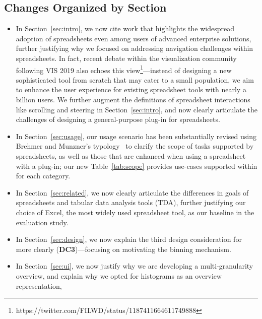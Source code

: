 \subsection*{Changes Organized by Section}
\begin{itemize}
	\leftmargin=25pt \rightmargin=0pt   \itemindent=0pt \listparindent=0pt \topsep=0pt plus 2pt minus 4pt \partopsep=0pt plus 1pt minus 1pt \parsep=0pt plus 1pt \itemsep=\parsep
\item 
In Section~\ref{sec:intro}, we now cite
work that highlights the widespread adoption
of spreadsheets even among users of 
advanced enterprise solutions, further justifying 
why we focused on addressing navigation challenges within
spreadsheets. In fact, recent 
debate within the visualization community following
VIS 2019 also echoes this view\footnote{https://twitter.com/FILWD/status/1187411664611749888}---instead of designing a new sophisticated tool from scratch that 
may cater to a small population, 
we aim to enhance the user experience for
existing spreadsheet tools
with nearly a billion users.
We further augment   
the definitions of spreadsheet 
interactions like scrolling and steering in Section~\ref{sec:intro}, 
and now clearly articulate the challenges of 
designing a general-purpose plug-in for spreadsheets.
\item 
In Section~\ref{sec:usage}, 
our usage scenario has been substantially revised 
using Brehmer and Munzner's typology~\cite{brehmer2013multi} to
clarify the scope of tasks supported by spreadsheets, as well
as those that are enhanced
when using a spreadsheet with a \noah plug-in; our new Table~\ref{tab:scope}
provides use-cases supported within \noah
for each category.
\item
In Section~\ref{sec:related},
we now clearly
articulate the differences in goals
of spreadsheets and tabular data analysis tools (TDA),
further justifying our choice of Excel,
the most widely used spreadsheet tool,
as our baseline in the evaluation study.
\item 
In Section~\ref{sec:design},
we now explain the  
third design consideration 
for \noah more clearly
(\textbf{DC3})---focusing on motivating the binning
mechanism.
\item In Section~\ref{sec:ui}, 
we now justify why we are developing a 
multi-granularity overview,
and explain why 
we opted for histograms as an overview representation,  

\end{itemize}
